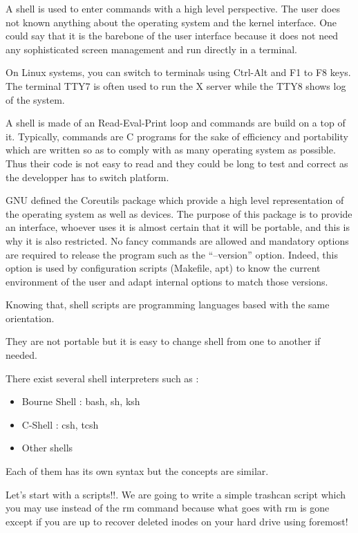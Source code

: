 
A shell is used to enter commands with a high level perspective. The user does not known anything about the operating system and the kernel interface.
One could say that it is the barebone of the user interface because it does not need any sophisticated screen management and run directly in a terminal.

On Linux systems, you can switch to terminals using Ctrl-Alt and F1 to F8 keys.
The terminal TTY7 is often used to run the X server while the TTY8 shows log of the system.

A shell is made of an Read-Eval-Print loop and commands are build on a top of it.
Typically, commands are C programs for the sake of efficiency and portability which are written so as to comply with as many operating system as possible.
Thus their code is not easy to read and they could be long to test and correct as the developper has to switch platform.

GNU defined the Coreutils package which provide a high level representation of the operating system as well as devices.
The purpose of this package is to provide an interface, whoever uses it is almost certain that it will be portable, and this is why it is also restricted.
No fancy commands are allowed and mandatory options are required to release the program such as the ``--version'' option.
Indeed, this option is used by configuration scripts (Makefile, apt) to know the current environment of the user and adapt internal options to match those versions.

Knowing that, shell scripts are programming languages based with the same orientation.

They are not portable but it is easy to change shell from one to another if needed.

There exist several shell interpreters such as :
\begin{itemize}
  \item{Bourne Shell : bash, sh, ksh}
  \item{C-Shell : csh, tcsh}
  \item{Other shells}
\end{itemize}

Each of them has its own syntax but the concepts are similar.

Let's start with a scripts!!.
We are going to write a simple trashcan script which you may use instead of the rm command because what goes with rm is gone except if you are up to recover deleted inodes on your hard drive using foremost!

